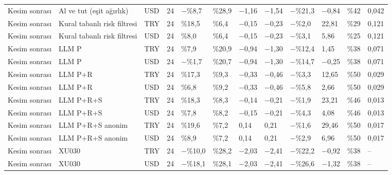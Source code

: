 \begin{table}
\begin{tabular}{llllllllllll}
Kesim sonrası & Al ve tut (eşit ağırlık) & USD & 24 & −\%8,7 & \%28,9 & −1,16 & −1,54 & −\%21,3 & −0,84 & \%42 & 0,042 \\
Kesim sonrası & Kural tabanlı risk filtresi & TRY & 24 & \%18,5 & \%6,4 & −0,15 & −0,23 & −\%2,0 & 22,81 & \%29 & 0,121 \\
Kesim sonrası & Kural tabanlı risk filtresi & USD & 24 & \%8,0 & \%6,4 & −0,15 & −0,23 & −\%3,1 & 5,86 & \%25 & 0,121 \\
Kesim sonrası & LLM P & TRY & 24 & \%7,9 & \%20,9 & −0,94 & −1,30 & −\%12,4 & 1,45 & \%38 & 0,071 \\
Kesim sonrası & LLM P & USD & 24 & −\%1,7 & \%20,7 & −0,94 & −1,30 & −\%14,7 & −0,25 & \%38 & 0,071 \\
Kesim sonrası & LLM P+R & TRY & 24 & \%17,3 & \%9,3 & −0,33 & −0,46 & −\%3,3 & 12,65 & \%50 & 0,029 \\
Kesim sonrası & LLM P+R & USD & 24 & \%6,8 & \%9,2 & −0,33 & −0,46 & −\%5,8 & 2,66 & \%50 & 0,029 \\
Kesim sonrası & LLM P+R+S & TRY & 24 & \%18,3 & \%8,3 & −0,14 & −0,21 & −\%1,9 & 23,21 & \%46 & 0,013 \\
Kesim sonrası & LLM P+R+S & USD & 24 & \%7,8 & \%8,2 & −0,15 & −0,21 & −\%4,3 & 4,08 & \%46 & 0,013 \\
Kesim sonrası & LLM P+R+S anonim & TRY & 24 & \%19,6 & \%7,2 & 0,14 & 0,21 & −\%1,6 & 29,46 & \%50 & 0,017 \\
Kesim sonrası & LLM P+R+S anonim & USD & 24 & \%8,9 & \%7,2 & 0,14 & 0,21 & −\%2,9 & 6,96 & \%50 & 0,017 \\
Kesim sonrası & XU030 & TRY & 24 & −\%10,0 & \%28,2 & −2,03 & −2,41 & −\%22,2 & −0,92 & \%38 & – \\
Kesim sonrası & XU030 & USD & 24 & −\%18,1 & \%28,1 & −2,03 & −2,41 & −\%26,6 & −1,32 & \%38 & – \\
\bottomrule
\end{tabular}
\end{table}
